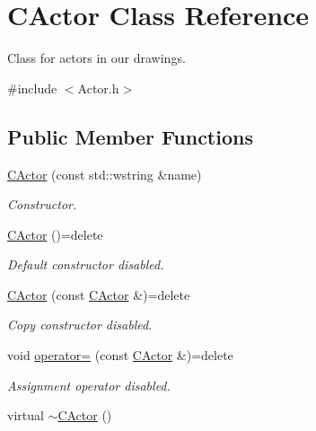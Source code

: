 \hypertarget{class_c_actor}{\section{C\+Actor Class Reference}
\label{class_c_actor}
}


Class for actors in our drawings.  




{\ttfamily \#include $<$Actor.\+h$>$}

\subsection*{Public Member Functions}
\begin{DoxyCompactItemize}
\item 
\hyperlink{class_c_actor_a2849f9370b66ddeaa727c8b7045d62c2}{C\+Actor} (const std\+::wstring \&name)
\begin{DoxyCompactList}\small\item\em Constructor. \end{DoxyCompactList}\item 
\hypertarget{class_c_actor_ae7683d5f0b3edc85dc47850fa71de40f}{\hyperlink{class_c_actor_ae7683d5f0b3edc85dc47850fa71de40f}{C\+Actor} ()=delete}\label{class_c_actor_ae7683d5f0b3edc85dc47850fa71de40f}

\begin{DoxyCompactList}\small\item\em Default constructor disabled. \end{DoxyCompactList}\item 
\hypertarget{class_c_actor_a8af986ad4ec530967f942aaebd853632}{\hyperlink{class_c_actor_a8af986ad4ec530967f942aaebd853632}{C\+Actor} (const \hyperlink{class_c_actor}{C\+Actor} \&)=delete}\label{class_c_actor_a8af986ad4ec530967f942aaebd853632}

\begin{DoxyCompactList}\small\item\em Copy constructor disabled. \end{DoxyCompactList}\item 
\hypertarget{class_c_actor_aa947810cfb2f45129b501296bcad837c}{void \hyperlink{class_c_actor_aa947810cfb2f45129b501296bcad837c}{operator=} (const \hyperlink{class_c_actor}{C\+Actor} \&)=delete}\label{class_c_actor_aa947810cfb2f45129b501296bcad837c}

\begin{DoxyCompactList}\small\item\em Assignment operator disabled. \end{DoxyCompactList}\item 
\hypertarget{class_c_actor_adca86a138fd9af275352336848ebad27}{virtual \hyperlink{class_c_actor_adca86a138fd9af275352336848ebad27}{$\sim$\+C\+Actor} ()}\label{class_c_actor_adca86a138fd9af275352336848ebad27}


\end{DoxyCompactItemize}
